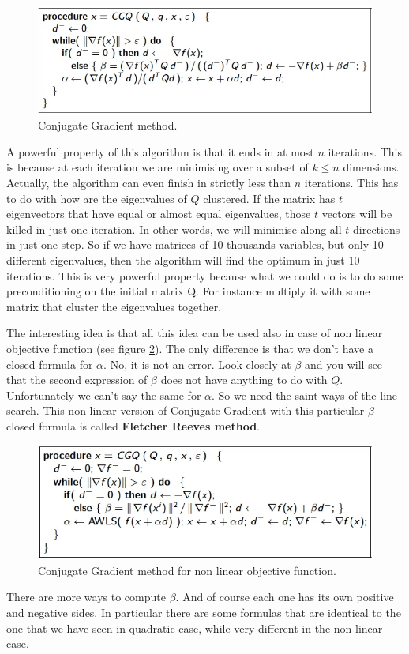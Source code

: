 \begin{figure}
    \centering
    \includegraphics[scale=0.5]{figures/2/chapter2-cgm.png}
    \caption{Conjugate Gradient method.}
    \label{fig:chapter2-cgm}
\end{figure}
\par A powerful property of this algorithm is that it ends in at most $n$ iterations. This is because at each iteration we are minimising over a subset of $k \leq n$ dimensions. Actually, the algorithm can even finish in strictly less than $n$ iterations. This has to do with how are the eigenvalues of $Q$ clustered. If the matrix has $t$ eigenvectors that have equal or almost equal eigenvalues, those $t$ vectors will be killed in just one iteration. In other words, we will minimise along all $t$ directions in just one step. So if we have matrices of 10 thousands variables, but only 10 different eigenvalues, then the algorithm will find the optimum in just 10 iterations. This is very powerful property because what we could do is to do some preconditioning on the initial matrix Q. For instance multiply it with some matrix that cluster the eigenvalues together.
\par The interesting idea is that all this idea can be used also in case of non linear objective function (see figure \ref{fig:chapter2-cgm_nl}). The only difference is that we don't have a closed formula for $\alpha$. No, it is not an error. Look closely at $\beta$ and you will see that the second expression of $\beta$ does not have anything to do with $Q$. Unfortunately we can't say the same for $\alpha$. So we need the saint ways of the line search. This non linear version of Conjugate Gradient with this particular $\beta$ closed formula is called \textbf{Fletcher Reeves method}.
\begin{figure}
    \centering
    \includegraphics[scale=0.54]{figures/2/chapter2-cgm_nl.png}
    \caption{Conjugate Gradient method for non linear objective function.}
    \label{fig:chapter2-cgm_nl}
\end{figure}
\par There are more ways to compute $\beta$. And of course each one has its own positive and negative sides. In particular there are some formulas that are identical to the one that we have seen in quadratic case, while very different in the non linear case.
